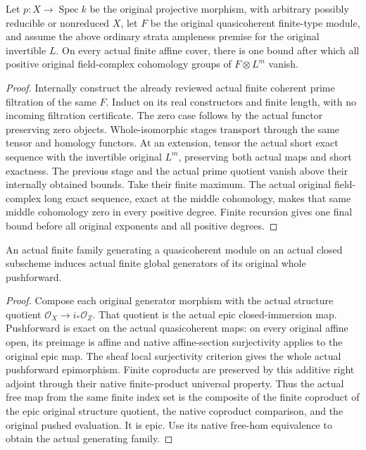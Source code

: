 \begin{theorem}
\label{thm:seshadri-original-strata-coherent-vanishing}
\leanok
Let $p:X\to\operatorname{Spec}k$ be the original projective morphism,
with arbitrary possibly reducible or nonreduced $X$, let $F$ be the original
quasicoherent finite-type module, and assume the above ordinary strata
ampleness premise for the original invertible $L$. On every actual finite
affine cover, there is one bound after which all positive original
field-complex cohomology groups of $F\otimes L^m$ vanish.
\end{theorem}
\begin{proof}
Internally construct the already reviewed actual finite coherent prime
filtration of the same $F$. Induct on its real constructors and finite
length, with no incoming filtration certificate. The zero case follows
by the actual functor preserving zero objects. Whole-isomorphic stages
transport through the same tensor and homology functors. At an extension,
tensor the actual short exact sequence with the invertible original
$L^m$, preserving both actual maps and short exactness. The previous
stage and the actual prime quotient vanish above their internally obtained
bounds. Take their finite maximum. The actual original field-complex
long exact sequence, exact at the middle cohomology, makes that same
middle cohomology zero in every positive degree. Finite recursion gives
one final bound before all original exponents and all positive degrees.
\end{proof}

\begin{lemma}
\label{lem:seshadri-original-closed-pushforward-generators}
An actual finite family generating a quasicoherent module on an actual
closed subscheme induces actual finite global generators of its original
whole pushforward.
\end{lemma}
\begin{proof}
Compose each original generator morphism with the actual structure quotient
$\mathcal O_X\to i_*\mathcal O_Z$. That quotient is the actual epic
closed-immersion map. Pushforward is exact on the actual quasicoherent
maps: on every original affine open, its preimage is affine and native
affine-section surjectivity applies to the original epic map. The sheaf
local surjectivity criterion gives the whole actual pushforward epimorphism.
Finite coproducts are preserved by this additive right adjoint through
their native finite-product universal property. Thus the actual free
map from the same finite index set is the composite of the finite
coproduct of the epic original structure quotient, the native coproduct
comparison, and the original pushed evaluation. It is epic. Use its
native free-hom equivalence to obtain the actual generating family.
\end{proof}

